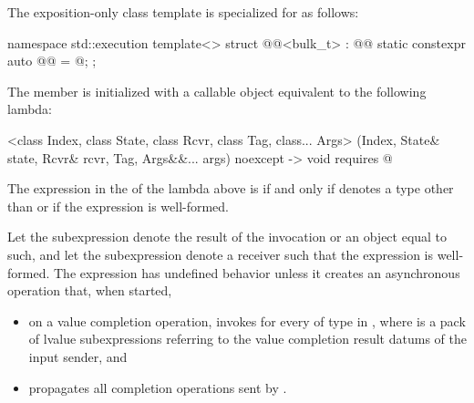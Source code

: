 \pnum
The exposition-only class template 
is specialized for  as follows:
\begin{codeblock}
namespace std::execution {
  template<>
  struct @@<bulk_t> : @@ {
    static constexpr auto @@ = @\seebelow@;
  };
}
\end{codeblock}

\pnum
The member 
is initialized with a callable object equivalent to the following lambda:
\begin{codeblock}
[]<class Index, class State, class Rcvr, class Tag, class... Args>
  (Index, State& state, Rcvr& rcvr, Tag, Args&&... args) noexcept -> void requires @
\end{codeblock}

\pnum
The expression in the  of the lambda above
is  if and only
if  denotes a type other than  or
if the expression  is well-formed.

\pnum
Let the subexpression  denote
the result of the invocation  or
an object equal to such, and
let the subexpression  denote a receiver
such that the expression  is well-formed.
The expression  has undefined behavior
unless it creates an asynchronous operation that,
when started,
\begin{itemize}
\item
on a value completion operation,
invokes 
for every  of type  in ,
where  is a pack of lvalue subexpressions
referring to the value completion result datums of the input sender, and
\item
propagates all completion operations sent by .
\end{itemize}

